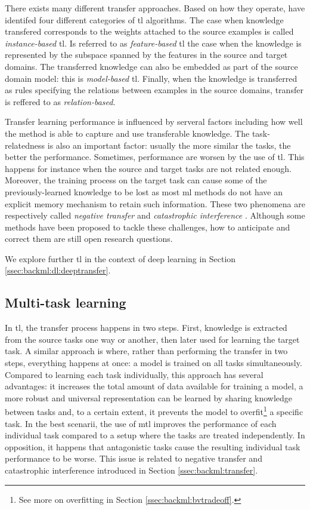 There exists many different transfer approaches. Based on how they operate, \parencite{yang2020transfer} have identifed four different categories of \acrlong{tl} algorithms. The case when knowledge transfered corresponds to the weights attached to the source examples is called \textit{instance-based} \acrlong{tl}. Is referred to as \textit{feature-based} \acrshort{tl} the case when the knowledge is represented by the subspace spanned by the features in the source and target domains. The transferred knowledge can also be embedded as part of the source domain model: this is \textit{model-based} \acrshort{tl}. Finally, when the knowledge is transferred as rules specifying the relations between examples in the source domains, transfer is reffered to as \textit{relation-based}. 

Transfer learning performance is influenced by serveral factors including how well the method is able to capture and use transferable knowledge. The task-relatedness is also an important factor: usually the more similar the tasks, the better the performance. Sometimes, performance are worsen by the use of \acrlong{tl}. This happens for instance when the source and target tasks are not related enough. Moreover, the training process on the target task can cause some of the previously-learned knowledge to be lost as most \acrlong{ml} methods do not have an explicit memory mechanism to retain such information. These two phenomena are respectively called \textit{negative transfer} \parencite{zhang2020overcoming} and \textit{catastrophic interference} \parencite{french1999catastrophic}. Although some methods have been proposed to tackle these challenges, how to anticipate and correct them are still open research questions.

We explore further \acrlong{tl} in the context of deep learning in Section \ref{ssec:backml:dl:deeptransfer}. 

\subsection{Multi-task learning}
\label{ssec:backml:mtl}

In \acrlong{tl}, the transfer process happens in two steps. First, knowledge is extracted from the source tasks one way or another, then later used for learning the target task. A similar approach is  where, rather than performing the transfer in two steps, everything happens at once: a model is trained on all tasks simultaneously. Compared to learning each task individually, this approach has several advantages: it increases the total amount of data available for training a model, a more robust and universal representation can be learned by sharing knowledge between tasks and, to a certain extent, it prevents the model to overfit\footnote{See more on overfitting in Section \ref{ssec:backml:bvtradeoff}.} a specific task. In the best scenarii, the use of \acrlong{mtl} improves the performance of each individual task compared to a setup where the tasks are treated independently. In opposition, it happens that antagonistic tasks cause the resulting individual task performance to be worse. This issue is related to negative transfer and catastrophic interference introduced in Section \ref{ssec:backml:transfer}. 

